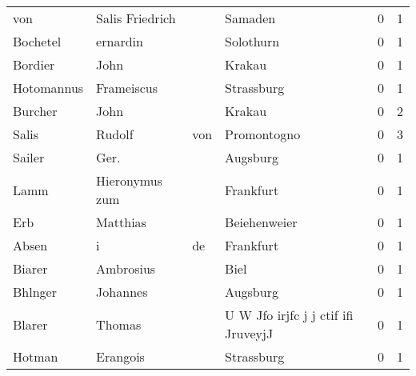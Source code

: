 \begin{center}
\begin{tiny}
\begin{longtabu}{llllrr}
                      von &                    Salis Friedrich &             &                                     Samaden &          0 &         1 \\
                 Bochetel &                           ernardin &             &                                   Solothurn &          0 &         1 \\
                  Bordier &                               John &             &                                      Krakau &          0 &         1 \\
               Hotomannus &                         Frameiscus &             &                                  Strassburg &          0 &         1 \\
                  Burcher &                               John &             &                                      Krakau &          0 &         2 \\
                    Salis &                             Rudolf &         von &                                 Promontogno &          0 &         3 \\
                   Sailer &                               Ger. &             &                                    Augsburg &          0 &         1 \\
                     Lamm &                     Hieronymus zum &             &                                   Frankfurt &          0 &         1 \\
                      Erb &                           Matthias &             &                                Beiehenweier &          0 &         1 \\
                    Absen &                                  i &          de &                                   Frankfurt &          0 &         1 \\
                   Biarer &                          Ambrosius &             &                                        Biel &          0 &         1 \\
                  Bhlnger &                           Johannes &             &                                    Augsburg &          0 &         1 \\
                   Blarer &                             Thomas &             &         U W Jfo irjfc j j ctif ifi JruveyjJ &          0 &         1 \\
                   Hotman &                           Erangois &             &                                  Strassburg &          0 &         1 \\

\end{longtabu}
\end{tiny}
\end{center}

